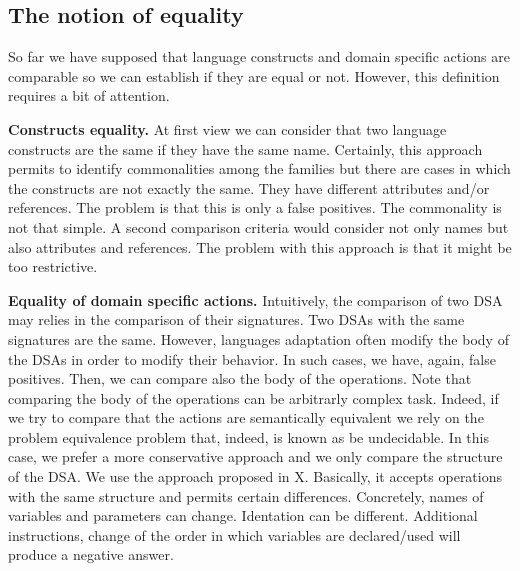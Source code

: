 \subsection{The notion of equality}

So far we have supposed that language constructs and domain specific actions are comparable so we can establish if they are equal or not. However, this definition requires a bit of attention. 

\textbf{Constructs equality.} At first view we can consider that two language constructs are the same if they have the same name. Certainly, this approach permits to identify commonalities among the families but there are cases in which the constructs are not exactly the same. They have different attributes and/or references. The problem is that this is only a false positives. The commonality is not that simple. A second comparison criteria would consider not only names but also attributes and references. The problem with this approach is that it might be too restrictive. 

\textbf{Equality of domain specific actions.} Intuitively, the comparison of two DSA may relies in the comparison of their signatures. Two DSAs with the same signatures are the same. However, languages adaptation often modify the body of the DSAs in order to modify their behavior. In such cases, we have, again, false positives. Then, we can compare also the body of the operations. Note that comparing the body of the operations can be arbitrarly complex task. Indeed, if we try to compare that the actions are semantically equivalent we rely on the problem equivalence problem that, indeed, is known as be undecidable. In this case, we prefer a more conservative approach and we only compare the structure of the DSA. We use the approach proposed in X. Basically, it accepts operations with the same structure and permits certain differences. Concretely, names of variables and parameters can change. Identation can be different. Additional instructions, change of the order in which variables are declared/used will produce a negative answer. 
